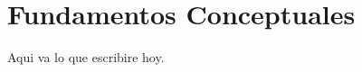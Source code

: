 
\chapter{Fundamentos Conceptuales} %
\label{cha:fundamentos_conceptuales}

Aqui va lo que escribire hoy.





